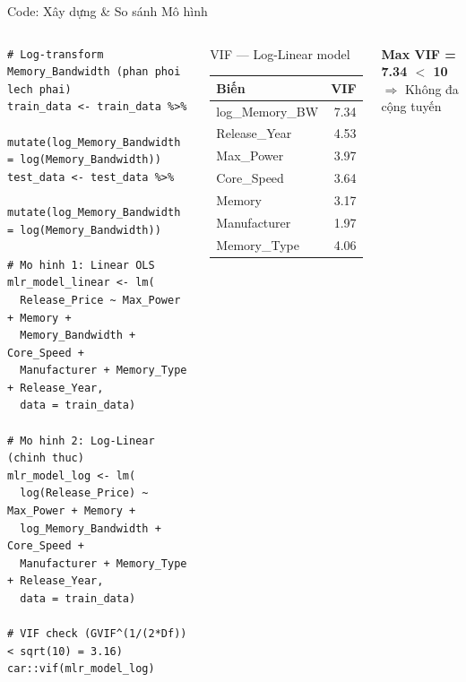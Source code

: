 \documentclass[13pt, aspectratio=169]{beamer}
\begin{document}
\begin{frame}[fragile]{Code: Xây dựng \& So sánh Mô hình}
  \begin{columns}[T]
      \begin{lstlisting}
# Log-transform Memory_Bandwidth (phan phoi lech phai)
train_data <- train_data %>%
  mutate(log_Memory_Bandwidth = log(Memory_Bandwidth))
test_data <- test_data %>%
  mutate(log_Memory_Bandwidth = log(Memory_Bandwidth))

# Mo hinh 1: Linear OLS
mlr_model_linear <- lm(
  Release_Price ~ Max_Power + Memory +
  Memory_Bandwidth + Core_Speed +
  Manufacturer + Memory_Type + Release_Year,
  data = train_data)

# Mo hinh 2: Log-Linear (chinh thuc)
mlr_model_log <- lm(
  log(Release_Price) ~ Max_Power + Memory +
  log_Memory_Bandwidth + Core_Speed +
  Manufacturer + Memory_Type + Release_Year,
  data = train_data)

# VIF check (GVIF^(1/(2*Df)) < sqrt(10) = 3.16)
car::vif(mlr_model_log)
      \end{lstlisting}
      \begin{block}{VIF --- Log-Linear model}
        \footnotesize
        \renewcommand{\arraystretch}{1.1}
        \begin{tabular}{lr}
          \toprule
          Biến & VIF \\
          \midrule
          log\_Memory\_BW & 7.34 \\
          Release\_Year & 4.53 \\
          Max\_Power & 3.97 \\
          Core\_Speed & 3.64 \\
          Memory & 3.17 \\
          Manufacturer & 1.97 \\
          Memory\_Type & 4.06 \\
          \bottomrule
        \end{tabular}
      \end{block}
      \vspace{0.3em}
      \begin{exampleblock}{}
        \footnotesize \textcolor{green!60!black}{\textbf{Max VIF = 7.34 $<$ 10}} \\
        $\Rightarrow$ Không đa cộng tuyến
      \end{exampleblock}
  \end{columns}
\end{frame}
\end{document}
